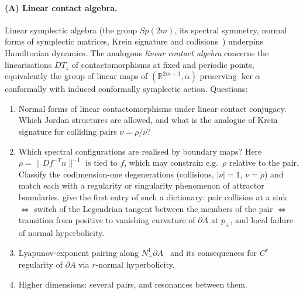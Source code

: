\documentclass[11pt,a4paper]{article}
\theoremstyle{definition}
\theoremstyle{remark}
\newcommand{\R}{\mathbb{R}}
\newcommand{\Nb}{N^1_+\partial A}
\begin{document}
\paragraph{(A) Linear contact algebra.} Linear symplectic algebra (the group $Sp(2m)$, its spectral symmetry, normal
forms of symplectic matrices, Krein signature and collisions~\cite{MS17}) underpins Hamiltonian dynamics. The analogous
\emph{linear contact algebra} concerns the linearisations $DT_z$ of contactomorphisms at fixed and periodic points,
equivalently the group of linear maps of $(\R^{2m+1},\alpha)$ preserving $\ker\alpha$ conformally with induced
conformally symplectic action. Questions:
\begin{enumerate}[label=(A\arabic*),leftmargin=*]
  \item Normal forms of linear contactomorphisms under linear contact conjugacy. Which Jordan structures are allowed,
  and what is the analogue of Krein signature for colliding pairs $\nu=\rho/\nu$?
  \item Which spectral configurations are realised by boundary maps? Here $\rho=\|Df^{-T}n\|^{-1}$ is tied to $f$, which
  may constrain e.g.\ $\rho$ relative to the pair. Classify the codimension-one degenerations (collisions, $|\nu|=1$,
  $\nu=\rho$) and match each with a regularity or singularity phenomenon of attractor boundaries. 
  give the first entry of such a dictionary: pair collision at a sink $\Leftrightarrow$ switch of the Legendrian tangent
  between the members of the pair $\Leftrightarrow$ transition from positive to vanishing curvature of $\partial A$ at
  $p_\pm$, and local failure of normal hyperbolicity.
  \item Lyapunov-exponent pairing along $\Nb$~\cite{WL98} and its consequences for $C^r$ regularity of $\partial A$ via
  $r$-normal hyperbolicity.
  \item Higher dimensions: several pairs, and resonances between them.
\end{enumerate}
\end{document}
